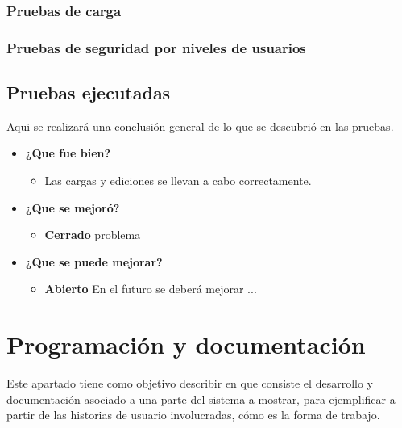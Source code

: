 \documentclass[a4paper,12pt]{article}
\begin{document}
\subsubsection{Pruebas de carga}

\subsubsection{Pruebas de seguridad por niveles de usuarios}


\subsection{Pruebas ejecutadas}
Aqui se realizará una conclusión general de lo que se descubrió en las pruebas.
	\begin{itemize}
		\item \textbf{¿Que fue bien?}
        	\begin{itemize}
				\item        Las cargas y ediciones se llevan a cabo correctamente.
			\end{itemize}

   		\item \textbf{¿Que se mejoró?}
        	\begin{itemize}
                \item \textbf{Cerrado} problema
			\end{itemize}

   		\item \textbf{¿Que se puede mejorar?}
        	\begin{itemize}
		        \item \textbf{Abierto} En el futuro se deberá mejorar ...
            \end{itemize}
        

	\end{itemize}











\section{Programación y documentación}
Este apartado tiene como objetivo describir en que consiste el desarrollo y documentación asociado a una parte del sistema a mostrar, para ejemplificar a partir de las historias de usuario involucradas, cómo es la forma de trabajo.
	
\end{document}

